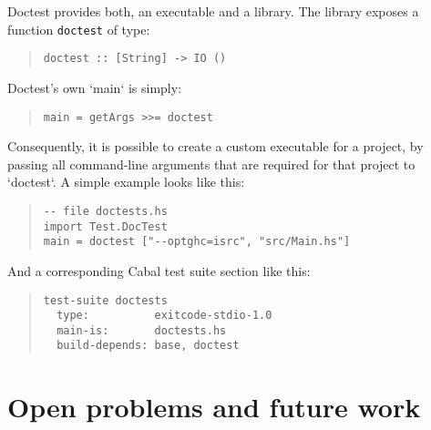 \documentclass[preprint]{sigplanconf}
\begin{document}
\noindent Doctest provides both, an executable and a library.  The library
exposes a function \verb|doctest| of type:


\begin{quote}
\small
\begin{verbatim}
doctest :: [String] -> IO ()
\end{verbatim}
\end{quote}

\noindent Doctest's own `main` is simply:
\begin{quote}
\small
\begin{verbatim}
main = getArgs >>= doctest
\end{verbatim}
\end{quote}



\noindent Consequently, it is possible to create a custom executable
for a project, by passing all command-line arguments that are required
for that project to `doctest`.  A simple example looks like this:

\begin{quote}
\small
\begin{verbatim}
-- file doctests.hs
import Test.DocTest
main = doctest ["--optghc=isrc", "src/Main.hs"]
\end{verbatim}
\end{quote}

\noindent And a corresponding Cabal test suite section like this:

\begin{quote}
\small
\begin{verbatim}
test-suite doctests
  type:          exitcode-stdio-1.0
  main-is:       doctests.hs
  build-depends: base, doctest
\end{verbatim}
\end{quote}

\section{Open problems and future work}
\end{document}
